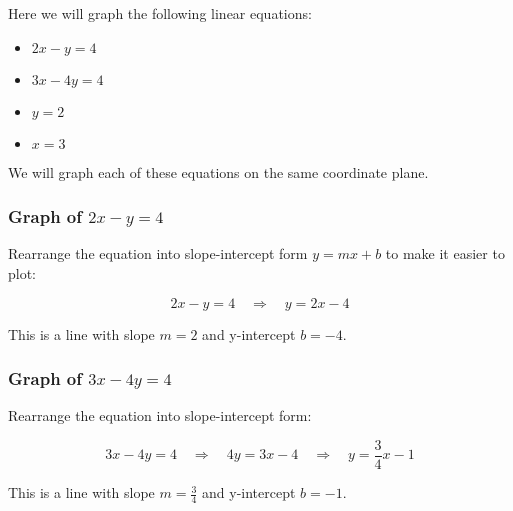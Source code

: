 Here we will graph the following linear equations:
\begin{itemize}
    \item \( 2x - y = 4 \)
    \item \( 3x - 4y = 4 \)
    \item \( y = 2 \)
    \item \( x = 3 \)
\end{itemize}

We will graph each of these equations on the same coordinate plane.

\subsubsection*{Graph of \( 2x - y = 4 \)}

Rearrange the equation into slope-intercept form \( y = mx + b \) to make it easier to plot:

\[
2x - y = 4 \quad \Rightarrow \quad y = 2x - 4
\]

This is a line with slope \( m = 2 \) and y-intercept \( b = -4 \).

\begin{center}
\end{center}

\subsubsection*{Graph of \( 3x - 4y = 4 \)}

Rearrange the equation into slope-intercept form:

\[
3x - 4y = 4 \quad \Rightarrow \quad 4y = 3x - 4 \quad \Rightarrow \quad y = \frac{3}{4}x - 1
\]

This is a line with slope \( m = \frac{3}{4} \) and y-intercept \( b = -1 \).

\begin{center}
\end{center}

